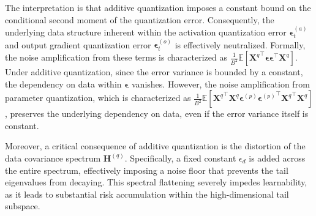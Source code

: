 \documentclass[11pt, letterpaper]{article}
\begin{document}
The interpretation is that additive quantization imposes a constant bound on the conditional second moment of the quantization error. Consequently, the underlying data structure inherent within the activation quantization error $\boldsymbol{\epsilon}_t^{(a)}$ and output gradient quantization error $\boldsymbol{\epsilon}_t^{(o)}$ is effectively neutralized. Formally, the noise amplification from these terms is characterized as $\frac{1}{B^2}\mathbb{E}[{\mathbf{X}^q}^\top \boldsymbol{\epsilon}\boldsymbol{\epsilon}^\top \mathbf{X}^q]$. Under additive quantization, since the error variance is bounded by a constant, the dependency on data within $\boldsymbol{\epsilon}$ vanishes. However, the noise amplification from parameter quantization, which is characterized as $\frac{1}{B^2}\mathbb{E}[{\mathbf{X}^q}^\top \mathbf{X}^q\boldsymbol{\epsilon}^{(p)}{\boldsymbol{\epsilon}^{(p)}}^\top{\mathbf{X}^q}^\top \mathbf{X}^q]$, preserves the underlying dependency on data, even if the error variance itself is constant.

Moreover, a critical consequence of additive quantization is the distortion of the data covariance spectrum $\mathbf{H}^{(q)}$. Specifically, a fixed constant $\epsilon_d$ is added across the entire spectrum, effectively imposing a noise floor that prevents the tail eigenvalues from decaying. This spectral flattening severely impedes learnability, as it leads to substantial risk accumulation within the high-dimensional tail subspace.

\end{document}
